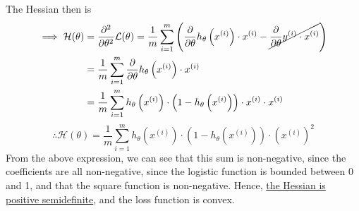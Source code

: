 The Hessian then is
\begin{align*}
    \implies
    \mathcal{H}(\theta)
     & =
    \frac{\partial^2}{\partial \theta^2} \mathcal{L}(\theta)
    =
    \frac{1}{m} \sum_{i=1}^{m}
    \left(
    \frac{\partial}{\partial \theta} h_{\theta}\left(x^{(i)}\right) \cdot x^{(i)}
    -
    \cancel{\frac{\partial}{\partial \theta} y^{(i)} \cdot x^{(i)}}
    \right)
    \\ & =
    \frac{1}{m} \sum_{i=1}^{m}
    \frac{\partial}{\partial \theta} h_{\theta}\left(x^{(i)}\right) \cdot x^{(i)}
    \\ & =
    \frac{1}{m} \sum_{i=1}^{m}
    h_{\theta}\left(x^{(i)}\right) \cdot \left(1-h_{\theta}\left(x^{(i)}\right)\right) \cdot x^{(i)} \cdot x^{(i)}
\end{align*}
\begin{equation*}
    \therefore
    \boxed{
        \mathcal{H}(\theta)
        =
        \frac{1}{m} \sum_{i=1}^{m}
        h_{\theta}\left(x^{(i)}\right) \cdot \left(1-h_{\theta}\left(x^{(i)}\right)\right)
        \cdot {\left(x^{(i)}\right)}^2
    }
\end{equation*}
From the above expression, we can see that this sum is non-negative, since the coefficients are all non-negative, since the logistic function is bounded between 0 and 1, and that the square function is non-negative.
Hence, \underline{the Hessian is positive semidefinite}, and the loss function is convex.
